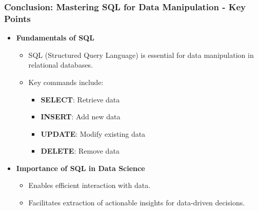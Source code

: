 \documentclass[aspectratio=169]{beamer}
\begin{document}
\begin{frame}[fragile]
    \frametitle{Conclusion: Mastering SQL for Data Manipulation - Key Points}
    \begin{itemize}
        \item \textbf{Fundamentals of SQL}
            \begin{itemize}
                \item SQL (Structured Query Language) is essential for data manipulation in relational databases.
                \item Key commands include:
                    \begin{itemize}
                        \item \textbf{SELECT}: Retrieve data
                        \item \textbf{INSERT}: Add new data
                        \item \textbf{UPDATE}: Modify existing data
                        \item \textbf{DELETE}: Remove data
                    \end{itemize}
            \end{itemize}
        
        \item \textbf{Importance of SQL in Data Science}
            \begin{itemize}
                \item Enables efficient interaction with data.
                \item Facilitates extraction of actionable insights for data-driven decisions.
            \end{itemize}
    \end{itemize}
\end{frame}
\end{document}
